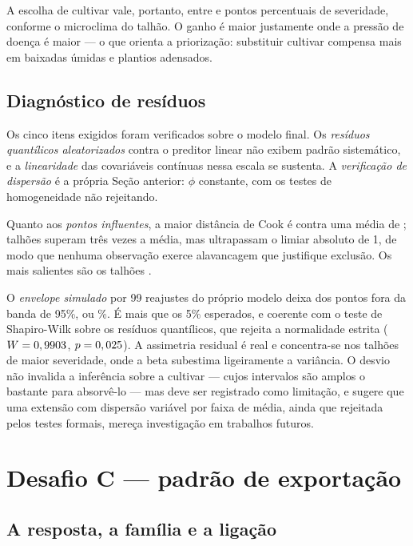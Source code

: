 A escolha de cultivar vale, portanto, entre \bPPdesfavoravel{} e \bPPfavoravel{} pontos
percentuais de severidade, conforme o microclima do talhão. O ganho é maior justamente
onde a pressão de doença é maior --- o que orienta a priorização: substituir cultivar
compensa mais em baixadas úmidas e plantios adensados.

\subsection{Diagnóstico de resíduos}

Os cinco itens exigidos foram verificados sobre o modelo final. Os \emph{resíduos
quantílicos aleatorizados} \cite{dunn1996} contra o preditor linear não exibem padrão
sistemático, e a \emph{linearidade} das covariáveis contínuas nessa escala se sustenta.
A \emph{verificação de dispersão} é a própria Seção anterior: $\phi$ constante, com os
testes de homogeneidade não rejeitando.

Quanto aos \emph{pontos influentes}, a maior distância de Cook é \bCookMax{} contra uma
média de \bCookMedia{}; \bCookAcimaTres{} talhões superam três vezes a média, mas
\bCookAcimaUm{} ultrapassam o limiar absoluto de 1, de modo que nenhuma observação
exerce alavancagem que justifique exclusão. Os mais salientes são os talhões
\bCookIds{}.

O \emph{envelope simulado} por 99 reajustes do próprio modelo deixa \bEnvFora{} dos
\bEnvTotal{} pontos fora da banda de 95\%, ou \bEnvForaPct\%. É mais que os 5\% esperados,
e coerente com o teste de Shapiro-Wilk sobre os resíduos quantílicos, que rejeita a
normalidade estrita ($W = 0,9903$, $p = 0,025$). A assimetria residual é real e
concentra-se nos talhões de maior severidade, onde a beta subestima ligeiramente a
variância. O desvio não invalida a inferência sobre a cultivar --- cujos intervalos são
amplos o bastante para absorvê-lo --- mas deve ser registrado como limitação, e sugere
que uma extensão com dispersão variável por faixa de média, ainda que rejeitada pelos
testes formais, mereça investigação em trabalhos futuros.

\section{Desafio C --- padrão de exportação}
\label{sec:desafioC}

\subsection{A resposta, a família e a ligação}

